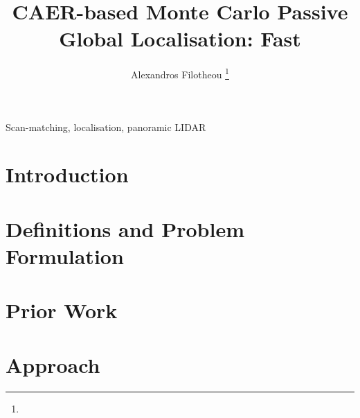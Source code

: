 \documentclass[letterpaper, 10 pt, conference]{ieeeconf}
\begin{document}
\title{\LARGE \bf CAER-based Monte Carlo Passive Global Localisation: Fast}


\author{Alexandros Filotheou%
  \thanks{}
}

\maketitle
\thispagestyle{empty}
\pagestyle{empty}


\begin{abstract}
  
\end{abstract}

\begin{keywords}
Scan-matching, localisation, panoramic LIDAR
\end{keywords}

\section{Introduction}
  

\section{Definitions and Problem Formulation}
  \label{section:definitions_and_problem_formulation}
  

\section{Prior Work}
  \label{section:sota}
  

\section{Approach}
  \label{section:the_proposed_method}
  

\end{document}
